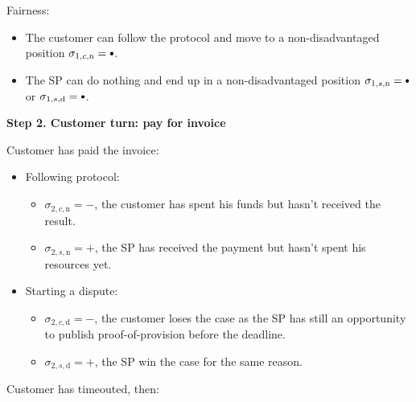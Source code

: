 \documentclass{ieeeaccess}
\newcommand\sbullet[1][.75]{\mathbin{\ThisStyle{\vcenter{\hbox{%
  \scalebox{#1}{$\SavedStyle\bullet$}}}}}%
}
\begin{document}
Fairness:

\begin{itemize}

\item
  The customer can follow the protocol and move to a non-disadvantaged
  position \(\sigma_{1, c, \mathrm{n}} = \sbullet\).
\item
  The SP can do nothing and end up in a non-disadvantaged position
  \(\sigma_{1, s, \mathrm{n}} = \sbullet \) or
  \(\sigma_{1, s, \mathrm{d}} = \sbullet \).
\end{itemize}

\noindent \textbf
{Step 2. Customer turn: pay for invoice}\label{step-2-pay-for-invoice}

Customer has paid the invoice:

\begin{itemize}
\item
  Following protocol:
  \begin{itemize}
  \item
    \(\sigma_{2, c, \mathrm{n}} = -\), the customer has spent his funds but hasn't received the result.
  \item
    \(\sigma_{2, s, \mathrm{n}} = +\), the SP has received the payment but hasn't spent his resources yet.
  \end{itemize}
\item
  Starting a dispute:

  \begin{itemize}
  \item
    \(\sigma_{2, c, \mathrm{d}} = -\), the customer loses the case as the SP has still an opportunity to publish proof-of-provision before the deadline.
  \item
    \(\sigma_{2, s, \mathrm{d}} = +\), the SP win the case for the same reason.
  \end{itemize}
\end{itemize}

Customer has timeouted, then:
\end{document}
